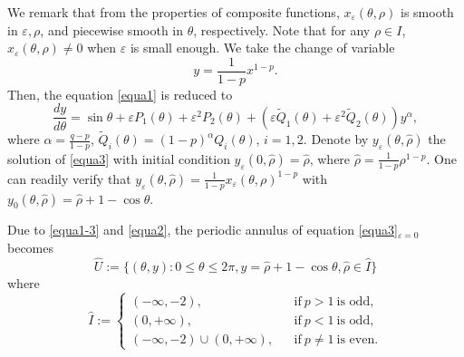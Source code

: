\documentclass[11pt]{amsart}
\theoremstyle{remark}
\theoremstyle{definition}
\begin{document}
We remark that from the properties of composite functions,  $x_{\varepsilon}(\theta,\rho)$ is smooth in  $\varepsilon,\rho$, and piecewise smooth in  $\theta$, respectively.
Note that for any $\rho\in I$, $x_{\varepsilon}(\theta,\rho) \neq0$ when  $\varepsilon$ is small enough.  We take the change of variable
\begin{equation}\label{equa2}
y=\frac{1}{1-p}x^{1-p}.
\end{equation}
Then, the   equation \eqref{equa1} is reduced to
\begin{equation}\label{equa3}
\frac{dy}{d\theta}
=\sin \theta+\varepsilon P_1(\theta)+\varepsilon^2 P_2(\theta) +(\varepsilon \tilde{Q}_1(\theta)+\varepsilon^2 \tilde{Q}_2(\theta)) y^{\alpha},
\end{equation}
where $\alpha=\frac{q-p}{1-p}$,   $\tilde{Q}_i(\theta)=(1-p)^{\alpha}Q_i(\theta)$,  $i=1,2$.   Denote by $ y_{\varepsilon}(\theta,\hat{\rho})$ the solution of \eqref{equa3} with initial condition $ y_{\varepsilon}(0,\hat{\rho})=\hat{\rho} $, where $ \hat{\rho}=\frac{1}{1-p}\rho^{1-p} $. One can readily verify that $y_{\varepsilon}(\theta,\hat{\rho})=\frac{1}{1-p}x_{\varepsilon}(\theta,\rho)^{1-p} $ with $y_0(\theta,\hat{\rho})=\hat{\rho}+1-\cos \theta$.

Due to \eqref{equa1-3} and \eqref{equa2},  the periodic annulus of equation \eqref{equa3}$_{\varepsilon=0}$ becomes  $$\hat{U}:=\{(\theta, y): 0\leq\theta\leq 2\pi, y=\hat{\rho}+1-\cos \theta, \hat{\rho}\in \hat{I}\}$$ where
\begin{equation}\label{equa1-4}
\hat{I}:=
\left\{
\begin{aligned}
(-\infty,-2),\quad\quad\quad\quad             &&  \mbox{if} \ p>1 \ \mbox{is odd},  \\
(0, +\infty),   \quad\quad\quad\quad\               &&  \mbox{if}\  p<1 \ \mbox{is odd},\\
(-\infty,-2)\cup (0, +\infty), &&  \mbox{if}\  p\neq 1 \ \mbox{is even}.
\end{aligned}
\right.
\end{equation}
\end{document}
